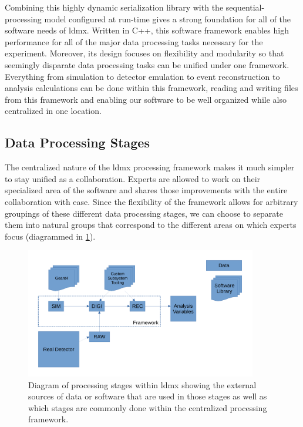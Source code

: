 Combining this highly dynamic serialization library with the sequential-processing model configured at run-time gives a strong foundation for all of the software needs of \ac{ldmx}. Written in C++, this software framework enables high performance for all of the major data processing tasks necessary for the experiment. Moreover, its design focuses on flexibility and modularity so that seemingly disparate data processing tasks can be unified under one framework. Everything from simulation to detector emulation to event reconstruction to analysis calculations can be done within this framework, reading and writing files from this framework and enabling our software to be well organized while also centralized in one location.

\subsection{Data Processing Stages}
The centralized nature of the \ac{ldmx} processing framework makes it much simpler to stay unified as a collaboration. Experts are allowed to work on their specialized area of the software and shares those improvements with the entire collaboration with ease. Since the flexibility of the framework allows for arbitrary groupings of these different data processing stages, we can choose to separate them into natural groups that correspond to the different areas on which experts focus (diagrammed in \cref{fig:ldmx:sim:data-stages}).

\begin{figure}
    \centering
    \includegraphics[width=0.9\textwidth]{figures/ldmx/simulation/data-flow.pdf}
    \caption{Diagram of processing stages within \ac{ldmx} showing the external sources of data or software that are used in those stages as well as which stages are commonly done within the centralized processing framework.}
    \label{fig:ldmx:sim:data-stages}
\end{figure}

